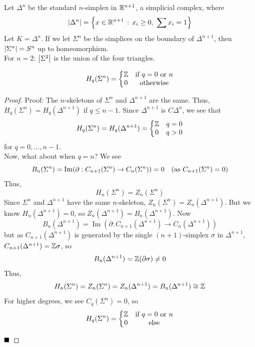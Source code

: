 Let $\Delta^n$ be the standard $n$-simplex in $\R^{n + 1}$, a simplicial complex, where
\[ \abs{\Delta^n} = \left\{x \in \R^{n + 1} \col x_i \geq 0,\ \sum x_i = 1\right\} \]
Let $K = \Delta^n$. If we let $\Sigma^n$ be the simplices on the boundary of $\Delta^{n + 1}$, then $\abs{\Sigma^n} = S^n$ up to homeomorphism.\\

For $n = 2$:
$\abs{\Sigma^2}$ is the union of the four triangles.

\begin{theorem}
    \[ H_q(\Sigma^n) = \left\{\begin{matrix} \Z & \tt{if } q = 0 \tt{ or } n \\ 0 & \tt{otherwise} \end{matrix}\right. \]
\end{theorem}
\begin{proof}{Proof:}
    The $n$-skeletons of $\Sigma^n$ and $\Delta^{n + 1}$ are the same. Thus, $H_q(\Sigma^n) = H_q(\Delta^{n + 1})$ if $q \leq n - 1$. Since $\Delta^{n + 1}$ is $C\Delta^n$, we see that
    \[ H_q(\Sigma^n) = H_q(\Delta^{n + 1}) = \left\{\begin{matrix} \Z & q = 0 \\ 0 & q > 0 \end{matrix}\right. \]
    for $q = 0, \ldots, n - 1$.\\

    Now, what about when $q = n$? We see
    \[ B_n(\Sigma^n) = \operatorname{Im}(\partial : C_{n + 1}(\Sigma^n) \to C_n(\Sigma^n)) = 0 \quad (\tt{as } C_{n + 1}(\Sigma^n) = 0) \]
    Thus,
    \[ H_n(\Sigma^n) = Z_n(\Sigma^n) \]
    Since $\Sigma^n$ and $\Delta^{n + 1}$ have the same $n$-skeleton, $Z_n(\Sigma^n) = Z_n(\Delta^{n + 1})$. But we know $H_n(\Delta^{n + 1}) = 0$, so $Z_n(\Delta^{n + 1}) = B_n(\Delta^{n + 1})$. Now
    \[ B_n(\Delta^{n + 1}) = \operatorname{Im}(\partial : C_{n + 1}(\Delta^{n + 1}) \to C_n(\Delta^{n + 1})) \]
    but as $C_{n + 1}(\Delta^{n + 1})$ is generated by the single $(n + 1)$-simplex $\sigma$ in $\Delta^{n + 1}$, $C_{n + 1}(\Delta^{n + 1}) = \Z\sigma$, so
    \[ B_n(\Delta^{n + 1}) = \Z(\partial\sigma) \neq 0 \]
    Thus,
    \[ H_{n}(\Sigma^{n}) = Z_n(\Sigma^n) = Z_n(\Delta^{n + 1}) = B_n(\Delta^{n + 1}) \cong \Z \]
    For higher degrees, we see $C_q(\Sigma^n) = 0$, so
    \[ H_q(\Sigma^n) = \left\{\begin{matrix} \Z & \tt{if } q = 0 \tt{ or } n \\ 0 & \tt{else} \end{matrix}\right. \]

    $\qed$
\end{proof}

